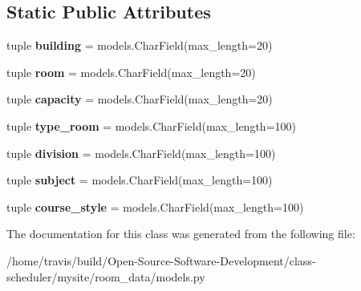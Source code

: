 \subsection*{Static Public Attributes}
\begin{DoxyCompactItemize}
\item 
\hypertarget{classroom__data_1_1models_1_1_room_a84c6045cd2158c8f1f530787dbb6e04c}{tuple {\bfseries building} = models.\-Char\-Field(max\-\_\-length=20)}\label{classroom__data_1_1models_1_1_room_a84c6045cd2158c8f1f530787dbb6e04c}

\item 
\hypertarget{classroom__data_1_1models_1_1_room_a4465c5e69d8764d6351fd761c6976a23}{tuple {\bfseries room} = models.\-Char\-Field(max\-\_\-length=20)}\label{classroom__data_1_1models_1_1_room_a4465c5e69d8764d6351fd761c6976a23}

\item 
\hypertarget{classroom__data_1_1models_1_1_room_aaeb7b8d63866030db3056ebf684095fb}{tuple {\bfseries capacity} = models.\-Char\-Field(max\-\_\-length=20)}\label{classroom__data_1_1models_1_1_room_aaeb7b8d63866030db3056ebf684095fb}

\item 
\hypertarget{classroom__data_1_1models_1_1_room_a1f34c55b05bdc3d9b720462950b0a790}{tuple {\bfseries type\-\_\-room} = models.\-Char\-Field(max\-\_\-length=100)}\label{classroom__data_1_1models_1_1_room_a1f34c55b05bdc3d9b720462950b0a790}

\item 
\hypertarget{classroom__data_1_1models_1_1_room_a6afd19c6865edcd6fb71b0138ebbd503}{tuple {\bfseries division} = models.\-Char\-Field(max\-\_\-length=100)}\label{classroom__data_1_1models_1_1_room_a6afd19c6865edcd6fb71b0138ebbd503}

\item 
\hypertarget{classroom__data_1_1models_1_1_room_aa752bd2000141de26a99993b319f7b85}{tuple {\bfseries subject} = models.\-Char\-Field(max\-\_\-length=100)}\label{classroom__data_1_1models_1_1_room_aa752bd2000141de26a99993b319f7b85}

\item 
\hypertarget{classroom__data_1_1models_1_1_room_a3c131868dd4abf806b74c4f4fc27c564}{tuple {\bfseries course\-\_\-style} = models.\-Char\-Field(max\-\_\-length=100)}\label{classroom__data_1_1models_1_1_room_a3c131868dd4abf806b74c4f4fc27c564}

\end{DoxyCompactItemize}


The documentation for this class was generated from the following file\-:\begin{DoxyCompactItemize}
\item 
/home/travis/build/\-Open-\/\-Source-\/\-Software-\/\-Development/class-\/scheduler/mysite/room\-\_\-data/models.\-py\end{DoxyCompactItemize}
